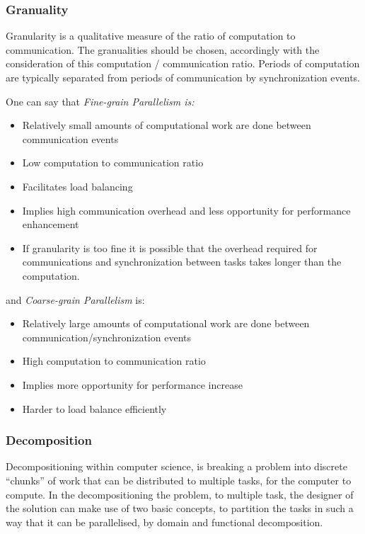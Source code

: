\subsubsection{Granuality}
Granularity is a qualitative measure of the ratio of computation to communication. The granualities should be chosen, accordingly with the consideration of this computation / communication ratio. Periods of computation are typically separated from periods of communication by synchronization events.

One can say that \emph{Fine-grain Parallelism is:}

\begin{itemize} 
\item Relatively small amounts of computational work are done between communication events
\item Low computation to communication ratio
\item Facilitates load balancing
\item Implies high communication overhead and less opportunity for performance enhancement
\item If granularity is too fine it is possible that the overhead required for communications and synchronization between tasks takes longer than the computation.
\end{itemize}

and \emph{Coarse-grain Parallelism} is:

\begin{itemize}
\item Relatively large amounts of computational work are done between communication/synchronization events
\item High computation to communication ratio
\item Implies more opportunity for performance increase
\item Harder to load balance efficiently
\end{itemize}

\subsubsection{Decomposition} 
Decompositioning within computer science, is breaking a problem into discrete \enquote{chunks} of work that can be distributed to multiple tasks, for the computer to compute. In the decompositioning the problem, to multiple task, the designer of the solution can make use of two basic concepts, to partition the tasks in such a way that it can be parallelised, by domain and functional decomposition.

